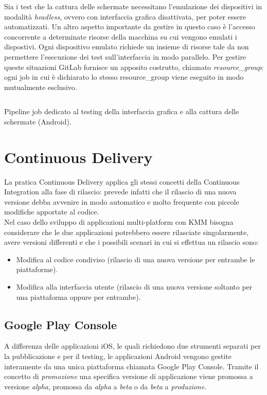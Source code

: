Sia i test che la cattura delle schermate necessitano l'emulazione dei dispositivi in modalità \textit{headless}, ovvero con interfaccia grafica disattivata, per poter essere automatizzati. Un altro aspetto importante da gestire in questo caso è l'accesso concorrente a determinate risorse della macchina su cui vengono emulati i dispostivi. Ogni dispositivo emulato richiede un insieme di risorse tale da non permettere l'esecuzione dei test sull'interfaccia in modo parallelo. Per gestire queste situazioni GitLab fornisce un apposito costrutto, chiamato \textit{resource\_group}: ogni job in cui è dichiarato lo stesso resource\_group viene eseguito in modo mutualmente esclusivo.

\begin{listing}[H]
\inputminted{yaml}{code/4-screenshot-ui-android}
\caption{Pipeline job dedicato al testing della interfaccia grafica e alla cattura delle schermate (Android).}
\end{listing}

\section{Continuous Delivery}
La pratica Continuous Delivery applica gli stessi concetti della Continuous Integration alla fase di rilascio: prevede infatti che il rilascio di una nuova versione debba avvenire in modo automatico e molto frequente con piccole modifiche apportate al codice.\\
Nel caso dello sviluppo di applicazioni multi-platform con KMM bisogna considerare che le due applicazioni potrebbero essere rilasciate singolarmente, avere versioni differenti e che i possibili scenari in cui si effettua un rilascio sono:
\begin{itemize}
    \item Modifica al codice condiviso (rilascio di una nuova versione per entrambe le piattaforme).
    \item Modifica alla interfaccia utente (rilascio di una nuova versione soltanto per una piattaforma oppure per entrambe).
\end{itemize}

\subsection{Google Play Console}
A differenza delle applicazioni iOS, le quali richiedono due strumenti separati per la pubblicazione e per il testing, le applicazioni Android vengono gestite interamente da una unica piattaforma chiamata Google Play Console. Tramite il concetto di \textit{promozione} una specifica versione di applicazione viene promossa a versione \textit{alpha}, promossa da \textit{alpha} a \textit{beta} o da \textit{beta} a \textit{produzione}.

